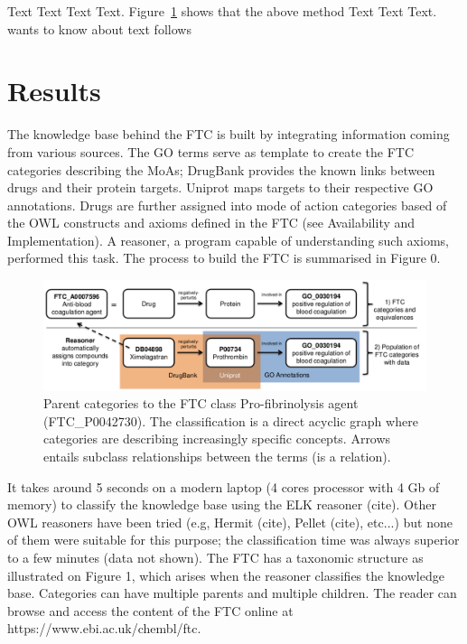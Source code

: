 \documentclass{bioinfo}
\begin{document}
 Text Text Text Text. Figure~\ref{fig:01} shows that the above method  Text 
   Text Text.  \citep{Bag01} wants to know about text follows

\section{Results}

The knowledge base behind the FTC is built by integrating information coming from various sources. 
The GO terms serve as template to create the FTC categories describing the MoAs; DrugBank provides the 
known links between drugs and their protein targets. Uniprot maps targets to their respective GO annotations. 
Drugs are further assigned into mode of action categories based of the OWL constructs and axioms defined in the 
FTC (see Availability and Implementation). A reasoner, a program capable of understanding such axioms, performed this task. 
The process to build the FTC is summarised in Figure 0.

\begin{figure}[!tpb]%
\centerline{\includegraphics{fig1.png}}
\caption{Parent categories to the FTC class Pro-fibrinolysis agent (FTC\_P0042730). The classification is a direct 
acyclic graph where categories are describing increasingly specific concepts. Arrows entails subclass relationships 
between the terms (is a relation).}\label{fig:01}
\end{figure}

It takes around 5 seconds on a modern 
laptop (4 cores processor with 4 Gb of memory) to classify the knowledge base using the ELK reasoner (cite). 
Other OWL reasoners have been tried (e.g, Hermit (cite), Pellet (cite), etc...) but none of them were suitable for this purpose; 
the classification time was always superior to a few minutes (data not shown). The FTC has a taxonomic structure as illustrated 
on Figure 1, which arises when the reasoner classifies the knowledge base. Categories can have multiple parents and multiple children. 
The reader can browse and access the content of the FTC online at {{https://www.ebi.ac.uk/chembl/ftc}}.
\end{document}
